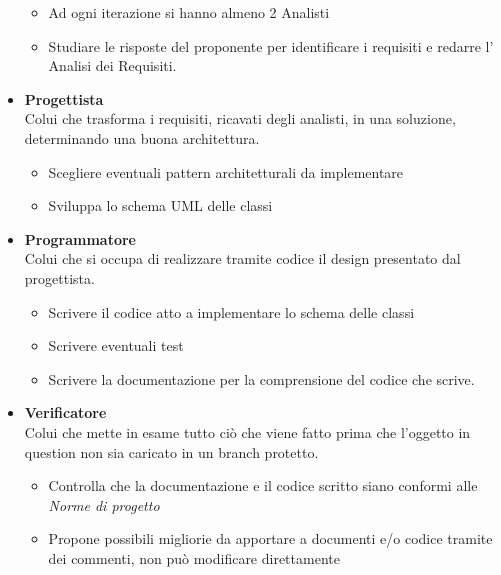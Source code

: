 \begin{itemize}
\begin{itemize}
                        \item Ad ogni iterazione si hanno almeno 2 Analisti
                        \item Studiare le risposte del proponente per identificare i requisiti e redarre l' Analisi dei Requisiti.
                    \end{itemize}
                \item \textbf{Progettista}\\
                Colui che trasforma i requisiti, ricavati degli analisti, in una soluzione, determinando una buona 
                architettura. 
                    \begin{itemize}
                        \item Scegliere eventuali pattern architetturali da implementare
                        \item Sviluppa lo schema UML delle classi
                    \end{itemize}
                \item \textbf{Programmatore}\\
                Colui che si occupa di realizzare tramite codice il design presentato dal progettista.
                    \begin{itemize}
                        \item Scrivere il codice atto a implementare lo schema delle classi
                        \item Scrivere eventuali test
                        \item Scrivere la documentazione per la comprensione del codice che scrive.
                    \end{itemize}
                \item \textbf{Verificatore}\\
                Colui che mette in esame tutto ciò che viene fatto  prima che l'oggetto in question non sia caricato in un branch protetto.
                    \begin{itemize}
                        \item Controlla che la documentazione e il codice scritto siano conformi alle \textit{Norme di progetto}
                        \item Propone possibili migliorie da apportare a documenti e/o codice tramite dei commenti, non può modificare direttamente
                    \end{itemize}
            \end{itemize}

